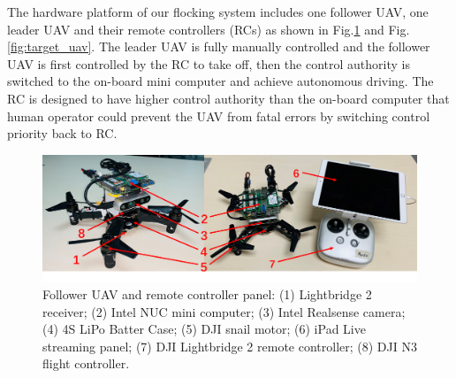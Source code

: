 The hardware platform of our flocking system includes one follower UAV, one leader UAV and their remote controllers (RCs) as shown in Fig.\ref{fig:quadrotor_controller} and Fig.\ref{fig:target_uav}. The leader UAV is fully manually controlled and the follower UAV is first controlled by the RC to take off, then the control authority is switched to the on-board mini computer and achieve autonomous driving. The RC is designed to have higher control authority than the on-board computer that human operator could prevent the UAV from fatal errors by switching control priority back to RC.

\begin{figure}[ht]
  \centering
  \includegraphics[width=1.0\textwidth]{figure/chapter_4/chaser_intro.png}
  \caption{Follower UAV and remote controller panel: (1) Lightbridge 2 receiver; (2) Intel NUC mini computer; (3) Intel Realsense camera; (4) 4S LiPo Batter Case; (5) DJI snail motor; (6) iPad Live streaming panel; (7) DJI Lightbridge 2 remote controller; (8) DJI N3 flight controller.}
  \label{fig:quadrotor_controller}
\end{figure}

